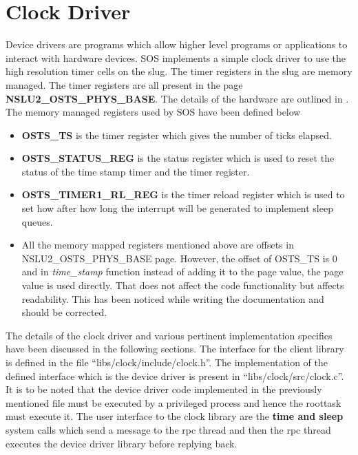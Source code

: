 \documentclass[a4paper, 11pt]{article}
\begin{document}
\section{Clock Driver}
Device drivers are programs which allow higher level programs or
applications to interact with hardware devices. SOS implements a
simple clock driver to use the high resolution timer cells on the
slug. The timer registers in the slug are memory managed. The timer
registers are all present in the page {\bf NSLU2\_OSTS\_PHYS\_BASE}. The
details of the hardware are outlined in \cite[Page
  411]{slug-manual}. The memory managed registers used by SOS have
been defined below
\begin{itemize}
\item {\bf OSTS\_TS} is the timer register which gives the number of
  ticks elapsed.
\item {\bf OSTS\_STATUS\_REG} is the status register which is used to
  reset the status of the time stamp timer and the timer register. 
\item {\bf OSTS\_TIMER1\_RL\_REG} is the timer reload register which is
  used to set how after how long the interrupt will be generated to
  implement sleep queues. 
\item All the memory mapped registers mentioned above are offsets in
  NSLU2\_OSTS\_PHYS\_BASE page. However, the offset of OSTS\_TS is 0 and
  in \textit{time\_stamp} function instead of adding it to the page value, the
  page value is used directly. That does not affect the code
  functionality but affects readability. This has been noticed while
  writing the documentation and should be corrected.
\end{itemize}
The details of the clock driver and various pertinent implementation
specifics have been discussed in the following sections. The interface
for the client library is defined in the file
``libs/clock/include/clock.h''. The implementation of the defined
interface which is the device driver is present in
``libs/clock/src/clock.c''. It is to be noted that the device driver code
implemented in the previously mentioned file must be executed by a
privileged process and hence the roottask must execute it. The user
interface to the clock library are the {\bf time and sleep} system
calls which send a message to the rpc thread and then the rpc thread
executes the device driver library before replying back. 
\end{document}
